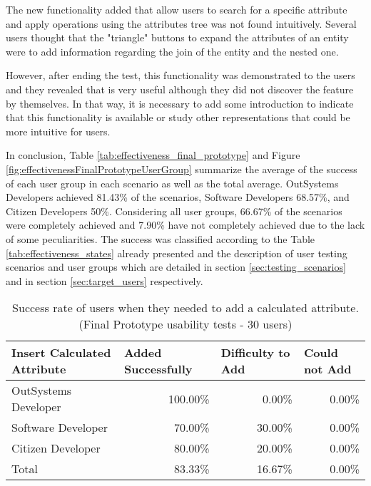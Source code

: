 
The new functionality added that allow users to search for a specific attribute and apply operations using the attributes tree was not found intuitively. Several users thought that the "triangle" buttons to expand the attributes of an entity were to add information regarding the join of the entity and the nested one.

However, after ending the test, this functionality was demonstrated to the users and they revealed that is very useful although they did not discover the feature by themselves. In that way, it is necessary to add some introduction to indicate that this functionality is available or study other representations that could be more intuitive for users.

In conclusion, Table \ref{tab:effectiveness_final_prototype} and Figure \ref{fig:effectivenessFinalPrototypeUserGroup} summarize the average of the success of each user group in each scenario as well as the total average. OutSystems Developers achieved 81.43\% of the scenarios, Software Developers 68.57\%, and Citizen Developers 50\%. Considering all user groups, 66.67\% of the scenarios were completely achieved and 7.90\% have not completely achieved due to the lack of some peculiarities. The success was classified according to the Table \ref{tab:effectiveness_states} already presented and the description of user testing scenarios and user groups which are detailed in section \ref{sec:testing_scenarios} and in section \ref{sec:target_users} respectively.


\begin{table}[tb]
  \caption{Success rate of users when they needed to add a calculated attribute. (Final Prototype usability tests - 30 users)}
    \label{tab:finalPrototypeCalculatedAttribute}
  \begin{tabular}{@{}lrrr@{}}
  \toprule
  \textbf{Insert Calculated Attribute} & \multicolumn{1}{l}{Added Successfully} & \multicolumn{1}{l}{Difficulty to Add} & \multicolumn{1}{l}{Could not Add} \\ \midrule
  OutSystems Developer                 & 100.00\%                               & 0.00\%                                & 0.00\%                            \\
  Software Developer                   & 70.00\%                                & 30.00\%                               & 0.00\%                            \\
  Citizen Developer                    & 80.00\%                                & 20.00\%                               & 0.00\%                            \\
  Total                                & 83.33\%                                & 16.67\%                               & 0.00\%                            \\ \bottomrule
  \end{tabular}
  \end{table}





